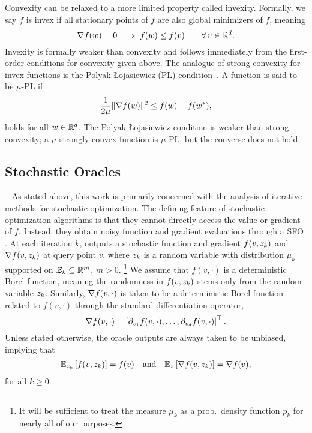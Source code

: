 Convexity can be relaxed to a more limited property called invexity.
Formally, we say \( f \) is invex if all stationary points of \( f \) are also global minimizers of \( f \), meaning
\[ \nabla f(w) = 0 \implies f(w) \leq f(v) \quad \quad \forall \, v \in \mathbb{R}^d.  \]
Invexity is formally weaker than convexity and follows immediately from the first-order conditions for convexity given above.
The analogue of strong-convexity for invex functions is the Polyak-Łojasiewicz (PL) condition~\citep{karimi2016linear}.
A function is said to be \( \mu \)-PL if
\[ \frac{1}{2 \mu} \|\nabla f(w)\|^2 \leq f(w) - f(w^*), \]
holds for all \( w \in \mathbb{R}^d \).
The Polyak-Łojasiewicz condition is weaker than strong convexity; a \( \mu \)-strongly-convex function is \( \mu \)-PL, but the converse does not hold.


\subsection{Stochastic Oracles}~\label{sec:stochastic-oracles}
As stated above, this work is primarily concerned with the analysis of iterative methods for stochastic optimization.
The defining feature of stochastic optimization algorithms is that they cannot directly access the value or gradient of \( f \).
Instead, they obtain noisy function and gradient evaluations through a \ac{SFO}  \oracle. 
At each iteration \( k \), \oracle{} outputs a stochastic function and gradient \( f(v, z_{k}) \) and \( \nabla f(v, z_{k}) \) at query point \( v \), where \( z_{k} \) is a random variable with distribution \( \mu_k \) supported on \( \mathcal{Z}_k \subseteq \mathbb{R}^m \), \( m > 0 \).%
\footnote{It will be sufficient to treat the measure \( \mu_k \) as a prob.\ density function \( p_k \) for nearly all of our purposes.}
We assume that \( f(v, \cdot) \) is a deterministic Borel function, meaning the randomness in \( f(v, z_{k}) \) stems only from the random variable \( z_{k} \).
Similarly, \( \nabla f(v, \cdot) \) is taken to be a deterministic Borel function related to \( f(v, \cdot) \) through the standard differentiation operator,
\[ \nabla f(v, \cdot) = \left[\partial_{v_1} f(v, \cdot), \ldots, \partial_{v_d} f(v, \cdot)\right]^\top. \]
Unless stated otherwise, the oracle outputs are always taken to be unbiased, implying that 
\begin{align*}
    \mathbb{E}_{z_{k}} \left[f(v, z_{k})\right] = f(v) \quad \text{and} \quad \mathbb{E}_{z} \left[\nabla f(v, z_{k})\right] = \nabla f(v), 
\end{align*}
for all \( k \geq 0 \).

